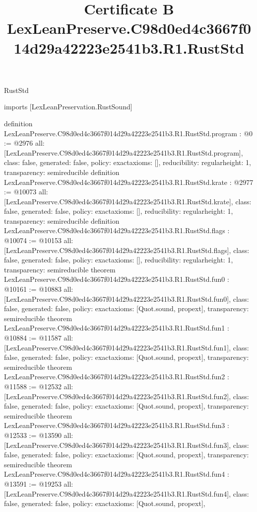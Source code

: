 \begin{lexlean}{RustStd}
\title{Certificate B LexLeanPreserve.C98d0ed4c3667f014d29a42223e2541b3.R1.RustStd}
\begin{coremodule}
imports [LexLeanPreservation.RustSound]

definition LexLeanPreserve.C98d0ed4c3667f014d29a42223e2541b3.R1.RustStd.program : @0 := @2976 {
  all: [LexLeanPreserve.C98d0ed4c3667f014d29a42223e2541b3.R1.RustStd.program],
  class: false,
  generated: false,
  policy: exact{axioms: []},
  reducibility: regular{height: 1},
  transparency: semireducible
}
definition LexLeanPreserve.C98d0ed4c3667f014d29a42223e2541b3.R1.RustStd.krate : @2977 := @10073 {
  all: [LexLeanPreserve.C98d0ed4c3667f014d29a42223e2541b3.R1.RustStd.krate],
  class: false,
  generated: false,
  policy: exact{axioms: []},
  reducibility: regular{height: 1},
  transparency: semireducible
}
definition LexLeanPreserve.C98d0ed4c3667f014d29a42223e2541b3.R1.RustStd.flags : @10074 := @10153 {
  all: [LexLeanPreserve.C98d0ed4c3667f014d29a42223e2541b3.R1.RustStd.flags],
  class: false,
  generated: false,
  policy: exact{axioms: []},
  reducibility: regular{height: 1},
  transparency: semireducible
}
theorem LexLeanPreserve.C98d0ed4c3667f014d29a42223e2541b3.R1.RustStd.fun0 : @10161 := @10883 {
  all: [LexLeanPreserve.C98d0ed4c3667f014d29a42223e2541b3.R1.RustStd.fun0],
  class: false,
  generated: false,
  policy: exact{axioms: [Quot.sound, propext]},
  transparency: semireducible
}
theorem LexLeanPreserve.C98d0ed4c3667f014d29a42223e2541b3.R1.RustStd.fun1 : @10884 := @11587 {
  all: [LexLeanPreserve.C98d0ed4c3667f014d29a42223e2541b3.R1.RustStd.fun1],
  class: false,
  generated: false,
  policy: exact{axioms: [Quot.sound, propext]},
  transparency: semireducible
}
theorem LexLeanPreserve.C98d0ed4c3667f014d29a42223e2541b3.R1.RustStd.fun2 : @11588 := @12532 {
  all: [LexLeanPreserve.C98d0ed4c3667f014d29a42223e2541b3.R1.RustStd.fun2],
  class: false,
  generated: false,
  policy: exact{axioms: [Quot.sound, propext]},
  transparency: semireducible
}
theorem LexLeanPreserve.C98d0ed4c3667f014d29a42223e2541b3.R1.RustStd.fun3 : @12533 := @13590 {
  all: [LexLeanPreserve.C98d0ed4c3667f014d29a42223e2541b3.R1.RustStd.fun3],
  class: false,
  generated: false,
  policy: exact{axioms: [Quot.sound, propext]},
  transparency: semireducible
}
theorem LexLeanPreserve.C98d0ed4c3667f014d29a42223e2541b3.R1.RustStd.fun4 : @13591 := @19253 {
  all: [LexLeanPreserve.C98d0ed4c3667f014d29a42223e2541b3.R1.RustStd.fun4],
  class: false,
  generated: false,
  policy: exact{axioms: [Quot.sound, propext]},
}
\end{coremodule}
\end{lexlean}
